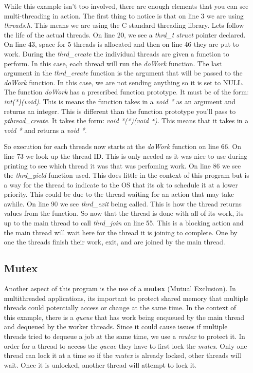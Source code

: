 \documentclass[../main.tex]{subfiles}
\begin{document}
	While this example isn't too involved, there are enough elements that you can see multi-threading in action.  The first thing to notice is that on line 3 we are using \textit{threads.h}.  This means we are using the C standard threading library. Lets follow the life of the actual threads.  On line 20, we see a \textit{thrd\_t struct} pointer declared.  On line 43, space for 5 threads is allocated and then on line 46 they are put to work.  During the \textit{thrd\_create} the individual threads are given a function to perform.  In this case, each thread will run the \textit{doWork} function.  The last argument in the \textit{thrd\_create} function is the argument that will be passed to the \textit{doWork} function.  In this case, we are not sending anything so it is set to NULL.  The function \textit{doWork} has a prescribed function prototype.  It must be of the form: \textit{int(*)(void\*)}.  This is means the function takes in a \textit{void *} as an argument and returns an integer.  This is different than the function prototype you'll pass to \textit{pthread\_create}.  It takes the form: \textit{void *(*)(void *)}.  This means that it takes in a \textit{void *} and returns a \textit{void *}. 
	
	So execution for each threads now starts at the \textit{doWork} function on line 66.  On line 73 we look up the thread ID.  This is only needed as it was nice to use during printing to see which thread it was that was perfoming work.  On line 86 we see the \textit{thrd\_yield} function used.  This does little in the context of this program but is a way for the thread to indicate to the OS that its ok to schedule it at a lower priority.  This could be due to the thread waiting for an action that may take awhile.  On line 90 we see \textit{thrd\_exit} being called.  This is how the thread returns values from the function.  So now that the thread is done with all of its work, its up to the main thread to call \textit{thrd\_join} on line 55.  This is a blocking action and the main thread will wait here for the thread it is joining to complete.  One by one the threads finish their work, exit, and are joined by the main thread.
	
	\subsection{Mutex}
	
	Another aspect of this program is the use of a \textbf{mutex} (Mutual Exclusion).  In multithreaded applications, its important to protect shared memory that multiple threads could potentially access or change at the same time.  In the context of this example, there is a \textit{queue} that has work being enqueued by the main thread and dequeued by the worker threads.  Since it could cause issues if multiple threads tried to dequeue a job at the same time, we use a \textit{mutex} to protect it.  In order for a thread to access the \textit{queue} they have to first lock the \textit{mutex}.  Only one thread can lock it at a time so if the \textit{mutex} is already locked, other threads will wait.  Once it is unlocked, another thread will attempt to lock it.
	
\end{document}
